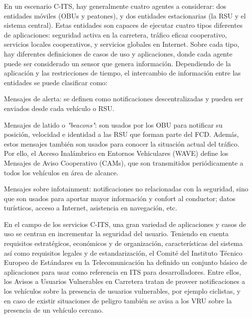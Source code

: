 En un escenario C-ITS, hay generalmente cuatro agentes a considerar: dos entidades móviles (OBUs y peatones),
y dos entidades estacionarias (la RSU y el sistema central). Estas entidades son capaces de ejecutar cuatro
tipos diferentes de aplicaciones: seguridad activa en la carretera, tráfico eficaz cooperativo, servicios
locales cooperativos, y servicios globales en Internet. Sobre cada tipo, hay diferentes definiciones de casos
de uso y aplicaciones, donde cada agente puede ser considerado un sensor que genera información. Dependiendo
de la aplicación y las restricciones de tiempo, el intercambio de información entre las entidades se puede
clasificar como:
\begin{description}
	\item{Mensajes de alerta:} se definen como notificaciones descentralizadas y pueden ser enviados desde cada vehículo
  o RSU.

	\item{Mensajes de latido o \emph{"beacons"}:} son usados por los OBU para notificar su posición, velocidad e
  identidad a las RSU que forman parte del FCD. Además, estos mensajes también son usados para conocer la situación
  actual del tráfico. Por ello, el Acceso Inalámbrico en Entornos Vehiculares (WAVE) define los Mensajes de Aviso
  Cooperativo (CAMs), que son transmitidos periódicamente a todos los vehículos en área de alcance.

	\item{Mensajes sobre infotainment}: notificaciones no relacionadas con la seguridad, sino que son usados para aportar
	mayor información y confort al conductor; datos turísticos, acceso a Internet, asistencia en navegación, etc.
\end{description}

En el campo de los servicios C-ITS, una gran variedad de aplicaciones y casos de uso se centran en incrementar la
seguridad del usuario. Teniendo en cuenta requisitos estratégicos, económicos y de organización, características
del sistema así como requisitos legales y de estandarización, el Comité del Instituto Técnico Europeo de Estándares
en la Telecomunicación ha definido un conjunto básico de aplicaciones para usar como referencia en ITS para
desarrolladores. Entre ellos, los Avisos a Usuarios Vulnerables en Carretera tratan de proveer notificaciones
a los vehículos sobre la presencia de usuarios vulnerables, por ejemplo ciclistas, y en caso de existir situaciones
de peligro también se avisa a los VRU sobre la presencia de un vehículo cercano.

